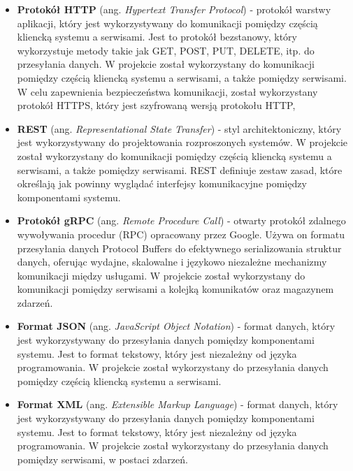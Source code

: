 \begin{itemize}

    \item \textbf{Protokół HTTP} (ang. \textit{Hypertext Transfer Protocol}) - protokół warstwy aplikacji, który jest wykorzystywany do komunikacji pomiędzy częścią kliencką systemu a serwisami. Jest to protokół bezstanowy, który wykorzystuje metody takie jak GET, POST, PUT, DELETE, itp. do przesyłania danych. W projekcie został wykorzystany do komunikacji pomiędzy częścią kliencką systemu a serwisami, a także pomiędzy serwisami. W celu zapewnienia bezpieczeństwa komunikacji, został wykorzystany protokół HTTPS, który jest szyfrowaną wersją protokołu HTTP,

    \item \textbf{REST} (ang. \textit{Representational State Transfer}) - styl architektoniczny, który jest wykorzystywany do projektowania rozproszonych systemów. W projekcie został wykorzystany do komunikacji pomiędzy częścią kliencką systemu a serwisami, a także pomiędzy serwisami. REST definiuje zestaw zasad, które określają jak powinny wyglądać interfejsy komunikacyjne pomiędzy komponentami systemu.
    
    \item \textbf{Protokół gRPC} (ang. \textit{Remote Procedure Call}) - otwarty protokół zdalnego wywoływania procedur (RPC) opracowany przez Google. Używa on formatu przesyłania danych Protocol Buffers do efektywnego serializowania struktur danych, oferując wydajne, skalowalne i językowo niezależne mechanizmy komunikacji między usługami. W projekcie został wykorzystany do komunikacji pomiędzy serwisami a kolejką komunikatów oraz magazynem zdarzeń.

    \item \textbf{Format JSON} (ang. \textit{JavaScript Object Notation}) - format danych, który jest wykorzystywany do przesyłania danych pomiędzy komponentami systemu. Jest to format tekstowy, który jest niezależny od języka programowania. W projekcie został wykorzystany do przesyłania danych pomiędzy częścią kliencką systemu a serwisami.
    
    \item \textbf{Format XML} (ang. \textit{Extensible Markup Language}) - format danych, który jest wykorzystywany do przesyłania danych pomiędzy komponentami systemu. Jest to format tekstowy, który jest niezależny od języka programowania. W projekcie został wykorzystany do przesyłania danych pomiędzy serwisami, w postaci zdarzeń.

\end{itemize}

